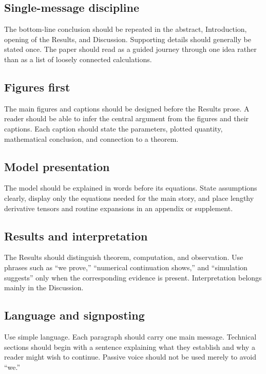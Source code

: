 \documentclass[11pt, reqno]{amsart}
\theoremstyle{definition}
\theoremstyle{remark}
\begin{document}
\subsection{Single-message discipline}

The bottom-line conclusion should be repeated in the abstract, Introduction,
opening of the Results, and Discussion.  Supporting details should generally be
stated once.  The paper should read as a guided journey through one idea rather
than as a list of loosely connected calculations.

\subsection{Figures first}

The main figures and captions should be designed before the Results prose.  A
reader should be able to infer the central argument from the figures and their
captions.  Each caption should state the parameters, plotted quantity,
mathematical conclusion, and connection to a theorem.

\subsection{Model presentation}

The model should be explained in words before its equations.  State assumptions
clearly, display only the equations needed for the main story, and place
lengthy derivative tensors and routine expansions in an appendix or supplement.

\subsection{Results and interpretation}

The Results should distinguish theorem, computation, and observation.  Use
phrases such as ``we prove,'' ``numerical continuation shows,'' and ``simulation
suggests'' only when the corresponding evidence is present.  Interpretation
belongs mainly in the Discussion.

\subsection{Language and signposting}

Use simple language.  Each paragraph should carry one main message.  Technical
sections should begin with a sentence explaining what they establish and why a
reader might wish to continue.  Passive voice should not be used merely to
avoid ``we.''
\end{document}
